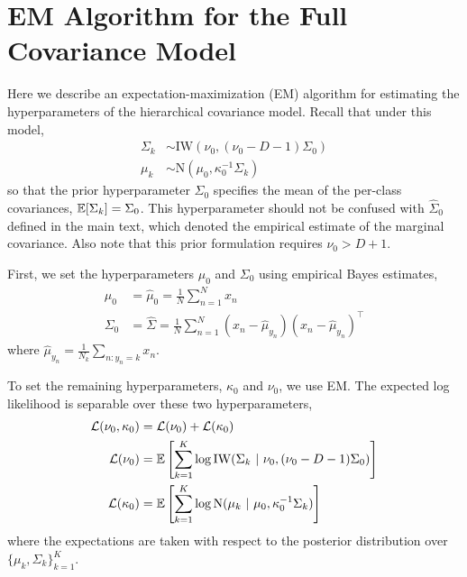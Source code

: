 \section{EM Algorithm for the Full Covariance Model}
\label{app:em-hdpmm}
Here we describe an expectation-maximization (EM) algorithm for estimating the hyperparameters of the hierarchical covariance model. Recall that under this model,
\begin{align*}
    \Sigma_k &\sim \mathrm{IW}(\nu_0, (\nu_0 - D - 1) \Sigma_0) \\
    \mu_k &\sim \mathrm{N}(\mu_0, \kappa_0^{-1} \Sigma_k)
\end{align*}
so that the prior hyperparameter $\Sigma_0$ specifies the mean of the per-class covariances, $\mathbb{E}[\Sigma_k] = \Sigma_0$. This hyperparameter should not be confused with $\hat{\Sigma}_0$ defined in the main text, which denoted the empirical estimate of the marginal covariance. Also note that this prior formulation requires $\nu_0 > D+1$.

First, we set the hyperparameters $\mu_0$ and $\Sigma_0$ using empirical Bayes estimates,
\begin{align}
    \mu_0 &= \hat{\mu}_0 = \frac{1}{N} \sum_{n=1}^N x_n \\
    \Sigma_0 &= \hat{\Sigma} = \frac{1}{N} \sum_{n=1}^N (x_n - \hat{\mu}_{y_n})(x_n - \hat{\mu}_{y_n})^\top
\end{align}
where $\hat{\mu}_{y_n} = \frac{1}{N_k} \sum_{n: y_n=k} x_n$.

To set the remaining hyperparameters, $\kappa_0$ and $\nu_0$, we use EM. The expected log likelihood is separable over these two hyperparameters,
\begin{align*}
    \mathcal{L}(\nu_0, \kappa_0) &= \mathcal{L}(\nu_0) + \mathcal{L}(\kappa_0) \\
    \mathcal{L}(\nu_0)
    &= \mathbb{E}\left[\sum_{k=1}^K \log \mathrm{IW}(\Sigma_k ~\vert~ \nu_0, (\nu_0 - D - 1)\Sigma_0) \right] \\
    \mathcal{L}(\kappa_0)
    &= \mathbb{E} \left[ \sum_{k=1}^K \log \mathrm{N}(\mu_k ~\vert~ \mu_0, \kappa_0^{-1} \Sigma_k) \right]
\end{align*}
where the expectations are taken with respect to the posterior distribution over $\{\mu_k, \Sigma_k\}_{k=1}^K$.

